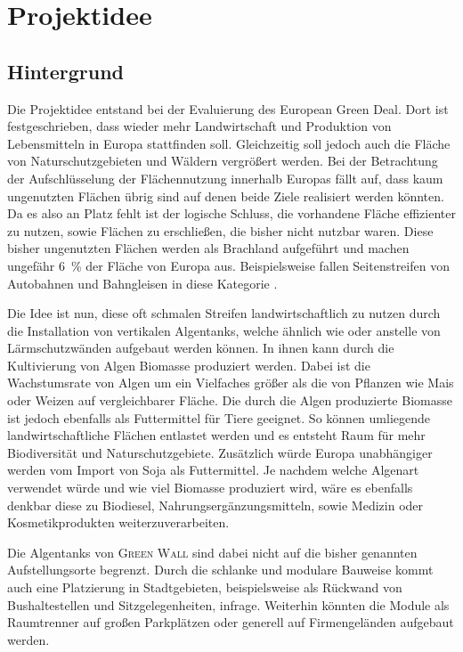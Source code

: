 \chapter{Projektidee}

\section{Hintergrund}

Die Projektidee entstand bei der Evaluierung des European Green Deal.
Dort ist festgeschrieben, dass wieder mehr Landwirtschaft und Produktion von Lebensmitteln in Europa stattfinden soll.
Gleichzeitig soll jedoch auch die Fläche von Naturschutzgebieten und Wäldern vergrößert werden.
Bei der Betrachtung der Aufschlüsselung der Flächennutzung innerhalb Europas fällt auf, dass kaum ungenutzten Flächen übrig sind auf denen beide Ziele realisiert werden könnten.
Da es also an Platz fehlt ist der logische Schluss, die vorhandene Fläche effizienter zu nutzen, sowie Flächen zu erschließen, die bisher nicht nutzbar waren.
Diese bisher ungenutzten Flächen werden als Brachland aufgeführt und machen ungefähr \qty{6}{\percent} der Fläche von Europa aus.
Beispielsweise fallen Seitenstreifen von Autobahnen und Bahngleisen in diese Kategorie \cite{Legislation2019.DerEuropaeischeGrueneDeal,Legislation2020.EUBiodiversitaetsstrategieFuer2030,Online.DieGemeinsameAgrarpolitikAufEinenBlick,Book2019.LandUndBodenInEuropa}.\par\medskip
%
Die Idee ist nun, diese oft schmalen Streifen landwirtschaftlich zu nutzen durch die Installation von vertikalen Algentanks, welche ähnlich wie oder anstelle von Lärmschutzwänden aufgebaut werden können.
In ihnen kann durch die Kultivierung von Algen Biomasse produziert werden.
Dabei ist die Wachstumsrate von Algen um ein Vielfaches größer als die von Pflanzen wie Mais oder Weizen auf vergleichbarer Fläche.
Die durch die Algen produzierte Biomasse ist jedoch ebenfalls als Futtermittel für Tiere geeignet.
So können umliegende landwirtschaftliche Flächen entlastet werden und es entsteht Raum für mehr Biodiversität und Naturschutzgebiete.
Zusätzlich würde Europa unabhängiger werden vom Import von Soja als Futtermittel.
Je nachdem welche Algenart verwendet würde und wie viel Biomasse produziert wird, wäre es ebenfalls denkbar diese zu Biodiesel, Nahrungsergänzungsmitteln, sowie Medizin oder Kosmetikprodukten weiterzuverarbeiten.\par\medskip

Die Algentanks von \textsc{Green Wall} sind dabei nicht auf die bisher genannten Aufstellungsorte begrenzt.
Durch die schlanke und modulare Bauweise kommt auch eine Platzierung in Stadtgebieten, beispielsweise als Rückwand von Bushaltestellen und Sitzgelegenheiten, infrage.
Weiterhin könnten die Module als Raumtrenner auf großen Parkplätzen oder generell auf Firmengeländen aufgebaut werden.\par\medskip

